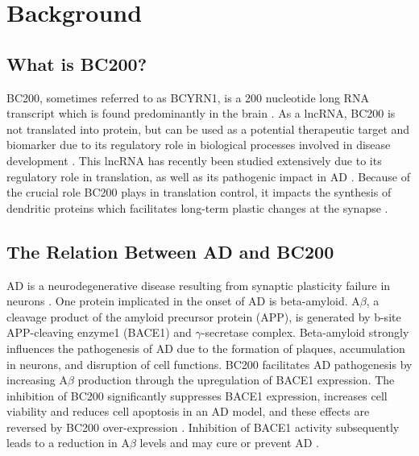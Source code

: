 \documentclass[conference, 11pt]{IEEEtran}
\begin{document}
\section{Background}\label{sec:background}

\subsection{What is BC200?}

BC200, sometimes referred to as BCYRN1, is a 200 nucleotide long RNA transcript which is found predominantly in the brain \cite{tiedge1993primary}. 
As a lncRNA, BC200 is not translated into protein, but can be used as a potential therapeutic target and biomarker due to its regulatory role in biological processes involved in disease development \cite{zhang2021role,mus2007dendritic}. 
This lncRNA has recently been studied extensively due to its regulatory role in translation, as well as its pathogenic impact in AD \cite{zhang2021role,tiedge1993primary}. 
Because of the crucial role BC200 plays in translation control, it impacts the synthesis of dendritic proteins which facilitates long-term plastic changes at the synapse \cite{mus2007dendritic}.

\subsection{The Relation Between AD and BC200}

AD is a neurodegenerative disease resulting from synaptic plasticity failure in neurons \cite{mus2007dendritic}. 
One protein implicated in the onset of AD is beta-amyloid. 
A$\beta$, a cleavage product of the amyloid precursor protein (APP), is generated by b-site APP-cleaving enzyme1 (BACE1) and $\gamma$-secretase complex. 
Beta-amyloid strongly influences the pathogenesis of AD due to the formation of plaques, accumulation in neurons, and disruption of cell functions. 
BC200 facilitates AD pathogenesis by increasing A$\beta$ production through the upregulation of BACE1 expression. 
The inhibition of BC200 significantly suppresses BACE1 expression, increases cell viability and reduces cell apoptosis in an AD model, and these effects are reversed by BC200 over-expression \cite{li2018identification,zhang2021role}. Inhibition of BACE1 activity subsequently leads to a reduction in A$\beta$ levels and may cure or prevent AD \cite{li2018identification,zhang2021role}.
\end{document}
